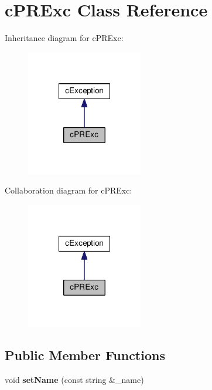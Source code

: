 \hypertarget{classcPRExc}{\section{c\-P\-R\-Exc \-Class \-Reference}
\label{d5/d34/classcPRExc}
}


\-Inheritance diagram for c\-P\-R\-Exc\-:\nopagebreak
\begin{figure}[H]
\begin{center}
\leavevmode
\includegraphics[width=144pt]{d0/da7/classcPRExc__inherit__graph}
\end{center}
\end{figure}


\-Collaboration diagram for c\-P\-R\-Exc\-:\nopagebreak
\begin{figure}[H]
\begin{center}
\leavevmode
\includegraphics[width=144pt]{de/d3b/classcPRExc__coll__graph}
\end{center}
\end{figure}
\subsection*{\-Public \-Member \-Functions}
\begin{DoxyCompactItemize}
\item 
\hypertarget{classcPRExc_a24b4994c84da2efc6fa6652d15809e14}{void {\bfseries set\-Name} (const string \&\-\_\-name)}\label{d5/d34/classcPRExc_a24b4994c84da2efc6fa6652d15809e14}

\end{DoxyCompactItemize}
